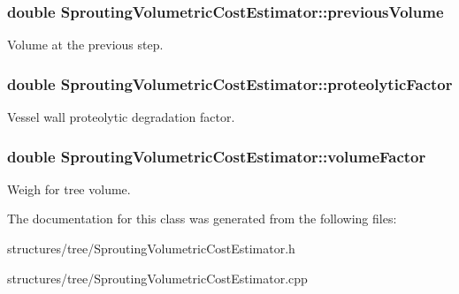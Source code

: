 \subsubsection[{\texorpdfstring{previous\+Volume}{previousVolume}}]{\setlength{\rightskip}{0pt plus 5cm}double Sprouting\+Volumetric\+Cost\+Estimator\+::previous\+Volume\hspace{0.3cm}{\ttfamily [private]}}\hypertarget{class_sprouting_volumetric_cost_estimator_af63fec9f1deab61aadd3f5f2889956a2}{}\label{class_sprouting_volumetric_cost_estimator_af63fec9f1deab61aadd3f5f2889956a2}
Volume at the previous step. 
\subsubsection[{\texorpdfstring{proteolytic\+Factor}{proteolyticFactor}}]{\setlength{\rightskip}{0pt plus 5cm}double Sprouting\+Volumetric\+Cost\+Estimator\+::proteolytic\+Factor\hspace{0.3cm}{\ttfamily [private]}}\hypertarget{class_sprouting_volumetric_cost_estimator_a9bedc9f85b7b98700fd977bfbe956a33}{}\label{class_sprouting_volumetric_cost_estimator_a9bedc9f85b7b98700fd977bfbe956a33}
Vessel wall proteolytic degradation factor. 
\subsubsection[{\texorpdfstring{volume\+Factor}{volumeFactor}}]{\setlength{\rightskip}{0pt plus 5cm}double Sprouting\+Volumetric\+Cost\+Estimator\+::volume\+Factor\hspace{0.3cm}{\ttfamily [private]}}\hypertarget{class_sprouting_volumetric_cost_estimator_ae0a2bc9b3f1b08ff1b69367a638452fe}{}\label{class_sprouting_volumetric_cost_estimator_ae0a2bc9b3f1b08ff1b69367a638452fe}
Weigh for tree volume. 

The documentation for this class was generated from the following files\+:\begin{DoxyCompactItemize}
\item 
structures/tree/Sprouting\+Volumetric\+Cost\+Estimator.\+h\item 
structures/tree/Sprouting\+Volumetric\+Cost\+Estimator.\+cpp\end{DoxyCompactItemize}
